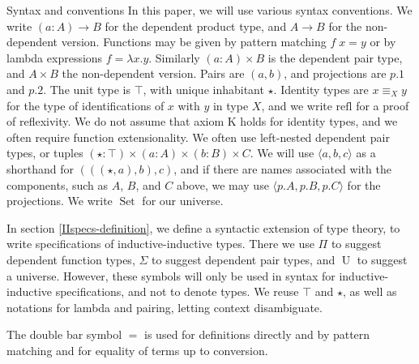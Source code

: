 \documentclass[acmsmall,review]{acmart}\settopmatter{printfolios=true,printccs=false,printacmref=false}
\DeclareMathOperator{\USet}{Set}
\DeclareMathOperator{\UU}{U}
\newcommand{\IdA}[3]{{#1}\equiv_{#3}{#2}}
\begin{document}
\begin{section}{Syntax and conventions}
    In this paper, we will use various syntax conventions. We write $(a : A) \to B$ for the dependent product type, and $A \to B$ for the non-dependent version. Functions may be given by pattern matching $f\; x = y$ or by lambda expressions $f = \lambda x.y$. Similarly $(a : A) \times B$ is the dependent pair type, and $A \times B$ the non-dependent version. Pairs are $(a, b)$, and projections are $p.1$ and $p.2$. The unit type is $\top$, with unique inhabitant $\star$. Identity types are $\IdA{x}{y}{X}$ for the type of identifications of $x$ with $y$ in type $X$, and we write $\text{refl}$ for a proof of reflexivity. We do not assume that axiom K holds for identity types, and we often require function extensionality. We often use left-nested dependent pair types, or tuples $(\star : \top) \times (a : A) \times (b : B) \times C$. We will use $\langle a, b, c\rangle$ as a shorthand for $(((\star, a), b), c)$, and if there are names associated with the components, such as $A$, $B$, and $C$ above, we may use $\langle p.A, p.B, p.C\rangle$ for the projections. We write $\USet$ for our universe.
    
    In section \ref{IIspecs-definition}, we define a syntactic extension of type theory, to write specifications of inductive-inductive types. There we use $\Pi$ to suggest dependent function types, $\Sigma$ to suggest dependent pair types, and $\UU$ to suggest a universe. However, these symbols will only be used in syntax for inductive-inductive specifications, and not to denote types. We reuse $\top$ and $\star$, as well as notations for lambda and pairing, letting context disambiguate.
    
    The double bar symbol $=$ is used for definitions directly and by pattern matching and for equality of terms up to conversion.
    

\end{section}
\end{document}
